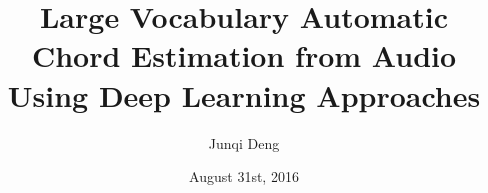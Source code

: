 
\clearpage{}  %

\title{\LARGE Large Vocabulary Automatic Chord Estimation from Audio Using Deep Learning Approaches}

\author{Junqi Deng}

\date{August 31st, 2016}


\thesis







\begin{umiabstract}
  
\end{umiabstract}

